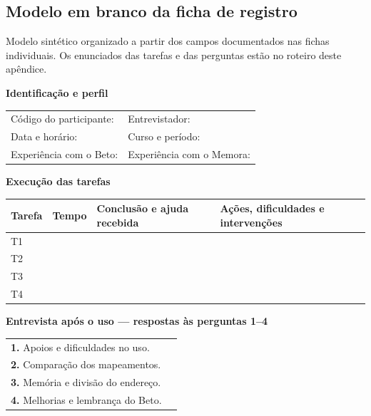 \clearpage
\subsection*{Modelo em branco da ficha de registro}
\label{ap:modelo-ficha-memora}

\begingroup
\small
\setlength{\parskip}{0.12cm}
\renewcommand{\arraystretch}{1.2}

Modelo sintético organizado a partir dos campos documentados nas fichas individuais. Os enunciados das tarefas e das perguntas estão no roteiro deste apêndice.

\noindent\textbf{Identificação e perfil}

\noindent\begin{tabular}{@{}P{7.6cm}P{7.6cm}@{}}
Código do participante: \hrulefill & Entrevistador: \hrulefill \\
Data e horário: \hrulefill & Curso e período: \hrulefill \\
Experiência com o Beto: \hrulefill & Experiência com o Memora: \hrulefill \\
\end{tabular}

\noindent\textbf{Execução das tarefas}

\noindent\begin{tabular}{@{}P{1.3cm}P{1.6cm}P{4.1cm}P{7.3cm}@{}}
\toprule
\textbf{Tarefa} & \textbf{Tempo} & \textbf{Conclusão e ajuda recebida} & \textbf{Ações, dificuldades e intervenções} \\
\midrule
T1 & & & \rule{0pt}{0.75cm} \\
\midrule
T2 & & & \rule{0pt}{0.75cm} \\
\midrule
T3 & & & \rule{0pt}{0.75cm} \\
\midrule
T4 & & & \rule{0pt}{0.75cm} \\
\bottomrule
\end{tabular}

\noindent\textbf{Entrevista após o uso --- respostas às perguntas 1--4}

\noindent\begin{tabular}{@{}P{5.0cm}P{10.4cm}@{}}
\textbf{1.} Apoios e dificuldades no uso. & \hrulefill \\[0.25cm]
\textbf{2.} Comparação dos mapeamentos. & \hrulefill \\[0.25cm]
\textbf{3.} Memória e divisão do endereço. & \hrulefill \\[0.25cm]
\textbf{4.} Melhorias e lembrança do Beto. & \hrulefill \\[0.25cm]
\end{tabular}

